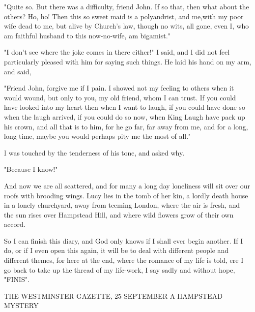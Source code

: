 "Quite so. But there was a difficulty, friend John. If so that, then what about the others? Ho, ho! Then this so sweet maid is a polyandrist, and me,with my poor wife dead to me, but alive by Church's law, though no wits, all gone, even I, who am faithful husband to this now-no-wife, am bigamist." 

"I don't see where the joke comes in there either!" I said, and I did not feel particularly pleased with him for saying such things. He laid his hand on my arm, and said, 

"Friend John, forgive me if I pain. I showed not my feeling to others when it would wound, but only to you, my old friend, whom I can trust. If you could have looked into my heart then when I want to laugh, if you could have done so when the laugh arrived, if you could do so now, when King Laugh have pack up his crown, and all that is to him, for he go far, far away from me, and for a long, long time, maybe you would perhaps pity me the most of all." 

I was touched by the tenderness of his tone, and asked why. 

"Because I know!" 

And now we are all scattered, and for many a long day loneliness will sit over our roofs with brooding wings. Lucy lies in the tomb of her kin, a lordly death house in a lonely churchyard, away from teeming London, where the air is fresh, and the sun rises over Hampstead Hill, and where wild flowers grow of their own accord. 

So I can finish this diary, and God only knows if I shall ever begin another. If I do, or if I even open this again, it will be to deal with different people and different themes, for here at the end, where the romance of my life is told, ere I go back to take up the thread of my life-work, I say sadly and without hope, "FINIS". 

THE WESTMINSTER GAZETTE, 25 SEPTEMBER A HAMPSTEAD MYSTERY 

